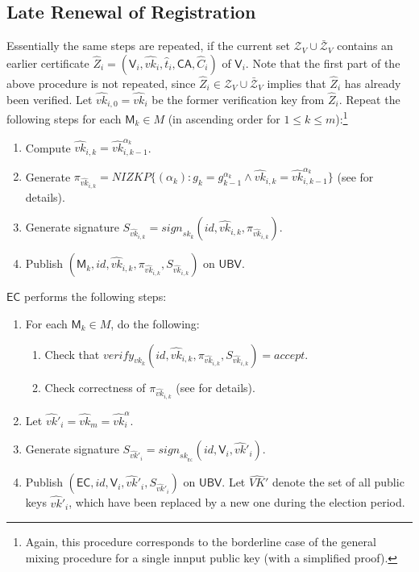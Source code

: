 \documentclass[bibtotoc,halfparskip,oneside]{scrreprt}
\newcommand{\eid}{\mathit{id}\xspace}
\newcommand{\sk}[1]{\mathit{sk}_{#1}\xspace}
\newcommand{\vk}[1]{\mathit{vk}_{#1}\xspace}
\newcommand{\vkhat}[1]{\hat{\mathit{vk}}_{#1}\xspace}
\newcommand{\vkhatprime}[1]{\hat{\mathit{vk}}'_{#1}\xspace}
\newcommand{\SK}[1]{\sk{_#1}\xspace}
\newcommand{\CA}{\ensuremath{\mathsf{CA}}\xspace}
\newcommand{\EC}{\ensuremath{\mathsf{EC}}\xspace}
\newcommand{\UBV}{\ensuremath{\mathsf{UBV}}\xspace}
\newcommand{\Mixer}[1]{\ensuremath{\mathsf{M}_{#1}}\xspace}
\newcommand{\Voter}[1]{\ensuremath{\mathsf{V}_{#1}}\xspace}
\begin{document}
	\subsection{Late Renewal of Registration}
	
	Essentially the same steps are repeated, if the current set $\mathcal{Z}_V \cup \bar{\mathcal{Z}}_V$ contains an earlier certificate $\hat{Z}_i=(\Voter{i},\vkhat{i},\hat{t}_i,\CA,\hat{C}_i)$ of $\Voter{i}$. Note that the first part of the above procedure is not repeated, since $\hat{Z}_i\in\mathcal{Z}_V \cup \bar{\mathcal{Z}}_V$ implies that $\hat{Z}_i$ has already been verified. Let $\vkhat{i,0}=\vkhat{i}$ be the former verification key from $\hat{Z}_i$. Repeat the following steps for each $\Mixer{k}\in M$ (in ascending order for $1\leq k\leq m$):\footnote{Again, this procedure corresponds to the borderline case of the general mixing procedure for a single innput public key (with a simplified proof).}
	
	\begin{enumerate}
		\item Compute $\vkhat{i,k}=\vkhat{i,k-1}^{\alpha_k}$.
		\	\item Generate $\pi_{\vkhat{i,k}}=\mathit{NIZKP}\{(\alpha_k):g_k=g_{k-1}^{\alpha_k}\wedge\vkhat{i,k}=\vkhat{i,k-1}^{\alpha_k}\}$ (see  for details).
		\item Generate signature $S_{\vkhat{i,k}}=\mathit{sign}_{\sk{k}}(\eid,\vkhat{i,k},\pi_{\vkhat{i,k}})$.
		\item Publish $(\Mixer{k},\eid,\vkhat{i,k},\pi_{\vkhat{i,k}},S_{\vkhat{i,k}})$ on \UBV.
	\end{enumerate}
	
	\EC performs the following steps:
	\begin{enumerate}[resume]
		\item For each $\Mixer{k}\in M$, do the following:
		\begin{enumerate}
			\item Check that $\mathit{verify}_{\vk{k}}(\eid,\vkhat{i,k},\pi_{\vkhat{i,k}},S_{\vkhat{i,k}})=\mathit{accept}$.
			\item Check correctness of $\pi_{\vkhat{i,k}}$ (see  for details).
		\end{enumerate}
		\item Let $\vkhatprime{i}=\vkhat{m}=\vkhat{i}^{\alpha}$.
		\item Generate signature $S_{\vkhatprime{i}}=\mathit{sign}_{\SK{\EC}}(\eid,\Voter{i},\vkhatprime{i})$.
		\item Publish $(\EC,\eid,\Voter{i},\vkhatprime{i},S_{\vkhatprime{i}})$ on \UBV. Let $\hat{\mathit{VK}}'$ denote the set of all public keys $\vkhatprime{i}$, which have been replaced by a new one during the election period.
	\end{enumerate}
	
\end{document}
